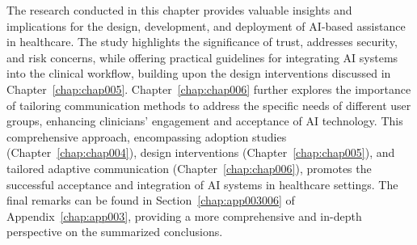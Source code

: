 The research conducted in this chapter provides valuable insights and implications for the design, development, and deployment of \ac{AI}-based assistance in healthcare.
The study highlights the significance of trust, addresses security, and risk concerns, while offering practical guidelines for integrating \ac{AI} systems into the clinical workflow, building upon the design interventions discussed in Chapter~\ref{chap:chap005}.
Chapter~\ref{chap:chap006} further explores the importance of tailoring communication methods to address the specific needs of different user groups, enhancing clinicians' engagement and acceptance of \ac{AI} technology.
This comprehensive approach, encompassing adoption studies (Chapter~\ref{chap:chap004}), design interventions (Chapter~\ref{chap:chap005}), and tailored adaptive communication (Chapter~\ref{chap:chap006}), promotes the successful acceptance and integration of \ac{AI} systems in healthcare settings.
The final remarks can be found in Section~\ref{chap:app003006} of Appendix~\ref{chap:app003}, providing a more comprehensive and in-depth perspective on the summarized conclusions.